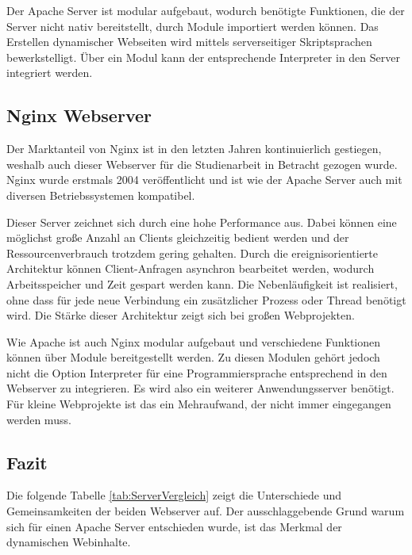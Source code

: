Der Apache Server ist modular aufgebaut, wodurch benötigte Funktionen, die der Server nicht nativ bereitstellt, durch Module importiert werden können. Das Erstellen dynamischer Webseiten wird mittels serverseitiger Skriptsprachen bewerkstelligt. Über ein Modul kann der entsprechende Interpreter in den Server integriert werden.


\subsection{Nginx Webserver}

Der Marktanteil von Nginx ist in den letzten Jahren kontinuierlich gestiegen, weshalb auch dieser Webserver für die Studienarbeit in Betracht gezogen wurde. Nginx wurde erstmals 2004 veröffentlicht und ist wie der Apache Server auch mit diversen Betriebssystemen kompatibel.

Dieser Server zeichnet sich durch eine hohe Performance aus. Dabei können eine möglichst große Anzahl an Clients gleichzeitig bedient werden und der Ressourcenverbrauch trotzdem gering gehalten. Durch die ereignisorientierte Architektur können Client-Anfragen asynchron bearbeitet werden, wodurch Arbeitsspeicher und Zeit gespart werden kann. Die Nebenläufigkeit ist realisiert, ohne dass für jede neue Verbindung ein zusätzlicher Prozess oder Thread benötigt wird.  Die Stärke dieser Architektur zeigt sich bei großen Webprojekten.

Wie Apache ist auch Nginx modular aufgebaut und verschiedene Funktionen können über Module bereitgestellt werden. Zu diesen Modulen gehört jedoch nicht die Option Interpreter für eine Programmiersprache entsprechend in den Webserver zu integrieren. Es wird also ein weiterer Anwendungsserver benötigt. Für kleine Webprojekte ist das ein Mehraufwand, der nicht immer eingegangen werden muss. 


\subsection{Fazit}

Die folgende Tabelle \ref{tab:ServerVergleich} zeigt die Unterschiede und Gemeinsamkeiten der beiden Webserver auf. Der ausschlaggebende Grund warum sich für einen Apache Server entschieden wurde, ist das Merkmal der dynamischen Webinhalte.

